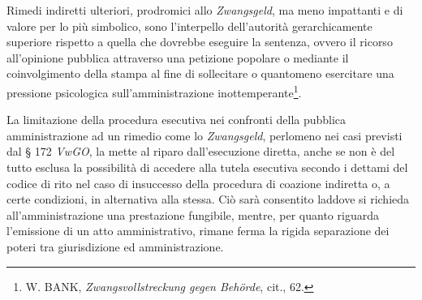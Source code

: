 \documentclass[12pt,it,a4paper,]{report}
\begin{document}
Rimedi indiretti ulteriori, prodromici allo \emph{Zwangsgeld}, ma meno
impattanti e di valore per lo più simbolico, sono l'interpello
dell'autorità gerarchicamente superiore rispetto a quella che dovrebbe
eseguire la sentenza, ovvero il ricorso all'opinione pubblica attraverso
una petizione popolare o mediante il coinvolgimento della stampa al fine
di sollecitare o quantomeno esercitare una pressione psicologica
sull'amministrazione inottemperante\footnote{W. BANK,
  \emph{Zwangsvollstreckung gegen Behörde}, cit., 62.}.

La limitazione della procedura esecutiva nei confronti della pubblica
amministrazione ad un rimedio come lo \emph{Zwangsgeld}, perlomeno nei
casi previsti dal § 172 \emph{VwGO}, la mette al riparo dall'esecuzione
diretta, anche se non è del tutto esclusa la possibilità di accedere
alla tutela esecutiva secondo i dettami del codice di rito nel caso di
insuccesso della procedura di coazione indiretta o, a certe condizioni,
in alternativa alla stessa. Ciò sarà consentito laddove si richieda
all'amministrazione una prestazione fungibile, mentre, per quanto
riguarda l'emissione di un atto amministrativo, rimane ferma la rigida
separazione dei poteri tra giurisdizione ed amministrazione.
\end{document}

